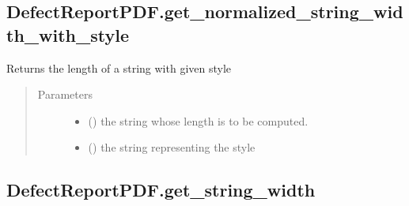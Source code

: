 \documentclass[letterpaper,10pt,english]{sphinxmanual}
\begin{document}
\begin{fulllineitems}
\subsection{DefectReportPDF.get\_normalized\_string\_width\_with\_style}
\label{\detokenize{generated/quality_assessment.quality_pdf_report.DefectReportPDF.get_normalized_string_width_with_style:defectreportpdf-get-normalized-string-width-with-style}}\label{\detokenize{generated/quality_assessment.quality_pdf_report.DefectReportPDF.get_normalized_string_width_with_style::doc}}

\begin{fulllineitems}
\label{\detokenize{generated/quality_assessment.quality_pdf_report.DefectReportPDF.get_normalized_string_width_with_style:quality_assessment.quality_pdf_report.DefectReportPDF.get_normalized_string_width_with_style}}
\sphinxAtStartPar
Returns the length of a string with given style
\begin{quote}\begin{description}
\item[{Parameters}] \leavevmode\begin{itemize}
\item {} 
\sphinxAtStartPar
{} () \textendash{} the string whose length is to be computed.

\item {} 
\sphinxAtStartPar
{} () \textendash{} the string representing the style

\end{itemize}

\end{description}\end{quote}

\end{fulllineitems}



\subsection{DefectReportPDF.get\_string\_width}
\label{\detokenize{generated/quality_assessment.quality_pdf_report.DefectReportPDF.get_string_width:defectreportpdf-get-string-width}}\label{\detokenize{generated/quality_assessment.quality_pdf_report.DefectReportPDF.get_string_width::doc}}


\end{fulllineitems}
\end{document}

